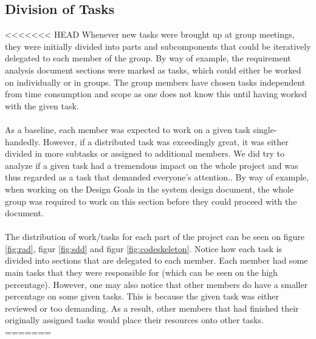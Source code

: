 \subsection{Division of Tasks}
<<<<<<< HEAD
Whenever new tasks were brought up at group meetings, they were initially divided into parts and subcomponents that could be iteratively delegated to each member of the group. By way of example, the requirement analysis document sections were marked as tasks, which could either be worked on individually or in groups. The group members have chosen tasks independent from time consumption and scope as one does not know this until having worked with the given task.
\\\\
As a baseline, each member was expected to work on a given task single-handedly. However, if a distributed task was exceedingly great, it was either divided in more subtasks or assigned to additional members. We did try to analyze if a given task had a tremendous impact on the whole project and was thus regarded as a task that demanded everyone's attention.. By way of example, when working on the Design Goals in the system design document, the whole group was required to work on this section before they could proceed with the document. 
\\\\
The distribution of work/tasks for each part of the project can be seen on figure \ref{fig:rad}, figur \ref{fig:sdd} and figur \ref{fig:codeskeleton}. Notice how each task is divided into sections that are delegated to each member. Each member had some main tasks that they were responsible for (which can be seen on the high percentage). However, one may also notice that other members do have a smaller percentage on some given tasks. This is because the given task was either reviewed or too demanding. As a result, other members that had finished their originally assigned tasks would place their resources onto other tasks.
=======

